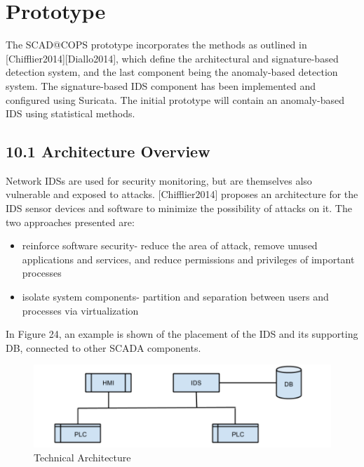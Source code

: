 \documentclass[12pt,]{article}
\begin{document}
\pagebreak

\section{Prototype}\label{prototype}

The SCAD@COPS prototype incorporates the methods as outlined in
{[}Chifflier2014{]}{[}Diallo2014{]}, which define the architectural and
signature-based detection system, and the last component being the
anomaly-based detection system. The signature-based IDS component has
been implemented and configured using Suricata. The initial prototype
will contain an anomaly-based IDS using statistical methods.

\subsection{10.1 Architecture Overview}\label{architecture-overview}

Network IDSs are used for security monitoring, but are themselves also
vulnerable and exposed to attacks. {[}Chifflier2014{]} proposes an
architecture for the IDS sensor devices and software to minimize the
possibility of attacks on it. The two approaches presented are:

\begin{itemize}
\itemsep1pt\parskip0pt
\item
  reinforce software security- reduce the area of attack, remove unused
  applications and services, and reduce permissions and privileges of
  important processes
\item
  isolate system components- partition and separation between users and
  processes via virtualization
\end{itemize}

In Figure 24, an example is shown of the placement of the IDS and its
supporting DB, connected to other SCADA components.

\begin{figure}

{\centering \includegraphics{thesis_files/figure-latex/unnamed-chunk-37-1} 

}

\caption{Technical Architecture}\label{fig:unnamed-chunk-37}
\end{figure}
\end{document}
